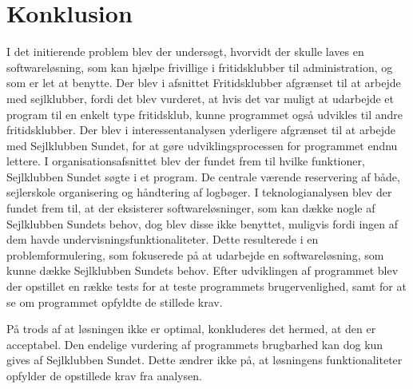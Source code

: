 \chapter{Konklusion} 
I det initierende problem blev der undersøgt, hvorvidt der skulle laves en softwareløsning, som kan hjælpe frivillige i fritidsklubber til administration, og som er let at benytte. 
Der blev i afsnittet Fritidsklubber afgrænset til at arbejde med sejlklubber, fordi det blev vurderet, at hvis det var muligt at udarbejde et program til en enkelt type fritidsklub, kunne programmet også udvikles til andre fritidsklubber. 
Der blev i interessentanalysen yderligere afgrænset til at arbejde med Sejlklubben Sundet, for at gøre udviklingsprocessen for programmet endnu lettere.
I organisationsafsnittet blev der fundet frem til hvilke funktioner, Sejlklubben Sundet søgte i et program.
De centrale værende reservering af både, sejlerskole organisering og håndtering af logbøger.
I teknologianalysen blev der fundet frem til, at der eksisterer softwareløsninger, som kan dække nogle af Sejlklubben Sundets behov, dog blev disse ikke benyttet, muligvis fordi ingen af dem havde undervisningsfunktionaliteter. 
Dette resulterede i en problemformulering, som fokuserede på at udarbejde en softwareløsning, som kunne dække Sejlklubben Sundets behov. 
Efter udviklingen af programmet blev der opstillet en række tests for at teste programmets brugervenlighed, samt for at se om programmet opfyldte de stillede krav.

På trods af at løsningen ikke er optimal, konkluderes det hermed, at den er acceptabel. 
Den endelige vurdering af programmets brugbarhed kan dog kun gives af Sejlklubben Sundet.
Dette ændrer ikke på, at løsningens funktionaliteter opfylder de opstillede krav fra analysen. 

